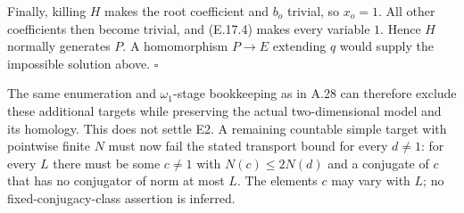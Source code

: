 Finally, killing $H$ makes the root coefficient and $b_o$
trivial, so $x_o=1$. All other coefficients then become
trivial, and (E.17.4) makes every variable $1$. Hence $H$
normally generates $P$. A homomorphism $P\to E$ extending
$q$ would supply the impossible solution above.
\hfill$\square$

The same enumeration and $\omega_1$-stage bookkeeping as in
A.28 can therefore exclude these additional targets while
preserving the actual two-dimensional model and its homology.
This does not settle E2. A remaining countable simple target
with pointwise finite $N$ must now fail the stated transport
bound for every $d\ne1$: for every $L$ there must be some
$c\ne1$ with $N(c)\leq2N(d)$ and a conjugate of $c$ that
has no conjugator of norm at most $L$. The elements $c$ may
vary with $L$; no fixed-conjugacy-class assertion is inferred.
